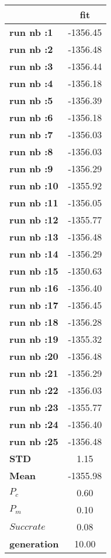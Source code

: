 \begin{tiny}\begin{tabular}{|l|c|}
\hline
&\textbf{fit}\\\hline
\textbf{run nb :1}&-1356.45\\\hline
\textbf{run nb :2}&-1356.48\\\hline
\textbf{run nb :3}&-1356.44\\\hline
\textbf{run nb :4}&-1356.18\\\hline
\textbf{run nb :5}&-1356.39\\\hline
\textbf{run nb :6}&-1356.18\\\hline
\textbf{run nb :7}&-1356.03\\\hline
\textbf{run nb :8}&-1356.03\\\hline
\textbf{run nb :9}&-1356.29\\\hline
\textbf{run nb :10}&-1355.92\\\hline
\textbf{run nb :11}&-1356.05\\\hline
\textbf{run nb :12}&-1355.77\\\hline
\textbf{run nb :13}&-1356.48\\\hline
\textbf{run nb :14}&-1356.29\\\hline
\textbf{run nb :15}&-1350.63\\\hline
\textbf{run nb :16}&-1356.40\\\hline
\textbf{run nb :17}&-1356.45\\\hline
\textbf{run nb :18}&-1356.28\\\hline
\textbf{run nb :19}&-1355.32\\\hline
\textbf{run nb :20}&-1356.48\\\hline
\textbf{run nb :21}&-1356.29\\\hline
\textbf{run nb :22}&-1356.03\\\hline
\textbf{run nb :23}&-1355.77\\\hline
\textbf{run nb :24}&-1356.40\\\hline
\textbf{run nb :25}&-1356.48\\\hline
\textbf{STD}&1.15\\\hline
\textbf{Mean}&-1355.98\\\hline
\textbf{$P_c$}&0.60\\\hline
\textbf{$P_{m}$}&0.10\\\hline
\textbf{$Succ rate$}&0.08\\\hline
\textbf{generation}&10.00\\\hline
\end{tabular}
\end{tiny}